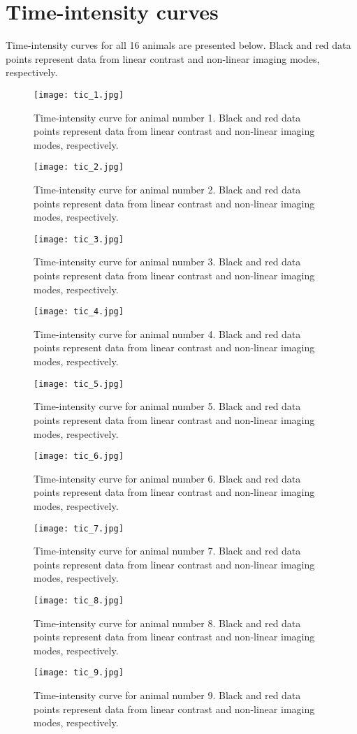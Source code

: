 \section{Time-intensity curves}
\label{tic appendix}
Time-intensity curves for all 16 animals are presented below. Black and red data points represent data from linear contrast and non-linear imaging modes, respectively.
\begin{figure}
	\texttt{[image: tic\_1.jpg]}
	\caption{Time-intensity curve for animal number 1. Black and red data points represent data from linear contrast and non-linear imaging modes, respectively.}
\end{figure}
\begin{figure}
	\texttt{[image: tic\_2.jpg]}
	\caption{Time-intensity curve for animal number 2. Black and red data points represent data from linear contrast and non-linear imaging modes, respectively.}
\end{figure}
\begin{figure}
	\texttt{[image: tic\_3.jpg]}
	\caption{Time-intensity curve for animal number 3. Black and red data points represent data from linear contrast and non-linear imaging modes, respectively.}
\end{figure}
\begin{figure}
	\texttt{[image: tic\_4.jpg]}
	\caption{Time-intensity curve for animal number 4. Black and red data points represent data from linear contrast and non-linear imaging modes, respectively.}
\end{figure}
\begin{figure}
	\texttt{[image: tic\_5.jpg]}
	\caption{Time-intensity curve for animal number 5. Black and red data points represent data from linear contrast and non-linear imaging modes, respectively.}
\end{figure}
\begin{figure}
	\texttt{[image: tic\_6.jpg]}
	\caption{Time-intensity curve for animal number 6. Black and red data points represent data from linear contrast and non-linear imaging modes, respectively.}
\end{figure}
\begin{figure}
	\texttt{[image: tic\_7.jpg]}
	\caption{Time-intensity curve for animal number 7. Black and red data points represent data from linear contrast and non-linear imaging modes, respectively.}
\end{figure}
\begin{figure}
	\texttt{[image: tic\_8.jpg]}
	\caption{Time-intensity curve for animal number 8. Black and red data points represent data from linear contrast and non-linear imaging modes, respectively.}
\end{figure}\begin{figure}
	\texttt{[image: tic\_9.jpg]}
	\caption{Time-intensity curve for animal number 9. Black and red data points represent data from linear contrast and non-linear imaging modes, respectively.}
\end{figure}
